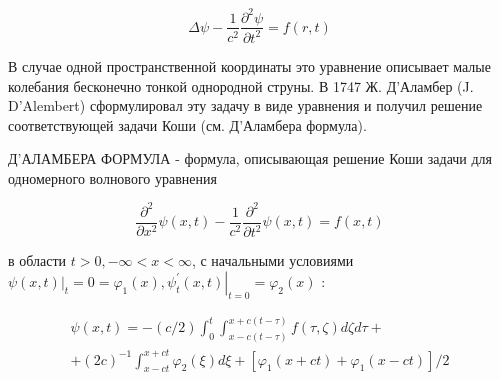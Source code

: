 \documentclass[10pt]{article}
\begin{document}
\[

\Delta \psi-\frac{1}{c^{2}} \frac{\partial^{2} \psi}{\partial t^{2}}=f(r, t)

\]



В случае одной пространственной координаты это уравнение описывает малые колебания бесконечно тонкой однородной струны. В 1747 Ж. Д'Аламбер (J. D'Alembert) сформулировал эту задачу в виде уравнения и получил решение соответствующей задачи Коши (см. Д'Аламбера формула).



Д'АЛАМБЕРА ФОРМУЛА - формула, описывающая решение Коши задачи для одномерного волнового уравнения



\[

\frac{\partial^{2}}{\partial x^{2}} \psi(x, t)-\frac{1}{c^{2}} \frac{\partial^{2}}{\partial t^{2}} \psi(x, t)=f(x, t)

\]



в области $t>0,-\infty<x<\infty$, с начальными условиями $\left.\psi(x, t)\right|_{t}=0=\varphi_{1}(x),\left.\psi_{t}^{\prime}(x, t)\right|_{t=0}=\varphi_{2}(x)$ :



\[

\begin{gathered}

\psi(x, t)=-(c / 2) \int_{0}^{t} \int_{x-c(t-\tau)}^{x+c(t-\tau)} f(\tau, \zeta) d \zeta d \tau+ \\

+(2 c)^{-1} \int_{x-c t}^{x+c t} \varphi_{2}(\xi) d \xi+\left[\varphi_{1}(x+c t)+\varphi_{1}(x-c t)\right] / 2

\end{gathered}

\]
\end{document}
